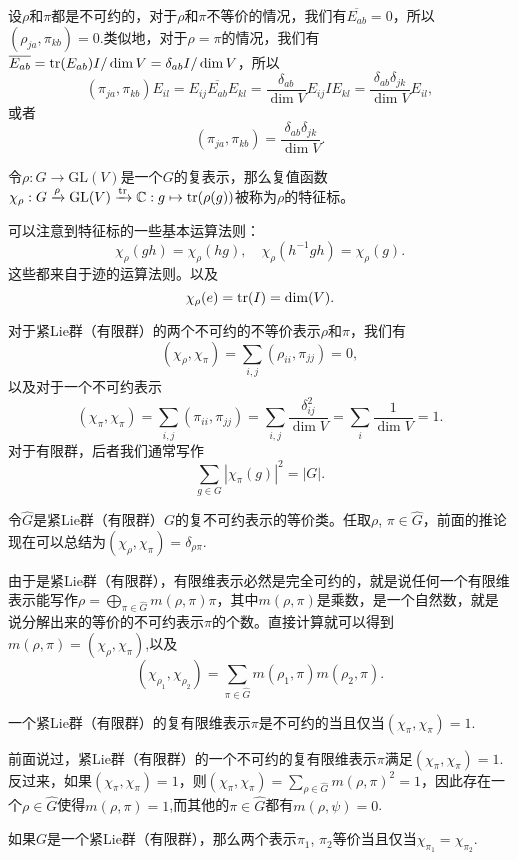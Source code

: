 \documentclass[11pt]{article}
\theoremstyle{definition}
\theoremstyle{plain}
\newcommand{\cc}{\mathbb{C}}
\begin{document}
\para 设$\rho$和$\pi$都是不可约的，对于$\rho$和$\pi$不等价的情况，我们有$\overline{E_{ab}}=0$，所以$\left(\rho_{ja},\pi_{kb}\right)=0$.类似地，对于$\rho=\pi$的情况，我们有$\overline{E_{ab}}=\operatorname{tr}(E_{ab})I/\dim V=\delta_{ab}I/\dim V$，所以
\[
	\left(\pi_{ja},\pi_{kb}\right)E_{il}=E_{ij}\overline{E_{ab}}E_{kl}=\frac{\delta_{ab}}{\dim V}E_{ij}IE_{kl}=\frac{\delta_{ab}\delta_{jk}}{\dim V}E_{il},
\]
或者
\[
	\left(\pi_{ja},\pi_{kb}\right)=\frac{\delta_{ab}\delta_{jk}}{\dim V}.
\]

\para 令$\rho:G\to \mathrm{GL}(V)$是一个$G$的复表示，那么复值函数$\chi_\rho:G\xrightarrow{\rho}\mathrm{GL}(V)\xrightarrow{\tr}\cc:g\mapsto \tr(\rho(g))$被称为$\rho$的特征标。

可以注意到特征标的一些基本运算法则：
\[
	\chi_\rho(gh)=\chi_\rho(hg),\quad \chi_\rho(h^{-1}gh)= \chi_\rho(g).
\]
这些都来自于迹的运算法则。以及
\[
	\chi_\rho(e)=\operatorname{tr}(I)=\dim(V).
\]

\para 对于紧Lie群（有限群）的两个不可约的不等价表示$\rho$和$\pi$，我们有
\[
(\chi_\rho, \chi_\pi)=\sum_{i,j}\left(\rho_{ii},\pi_{jj}\right)=0,
\]
以及对于一个不可约表示
\[
(\chi_\pi, \chi_\pi)=\sum_{i,j}(\pi_{ii},\pi_{jj})=\sum_{i,j}\frac{\delta_{ij}^2}{\dim V}=\sum_{i}\frac{1}{\dim V}=1.
\]
对于有限群，后者我们通常写作
\[
	\sum_{g\in G} |\chi_\pi(g)|^2=|G|.
\]

令$\hat{G}$是紧Lie群（有限群）$G$的复不可约表示的等价类。任取$\rho$, $\pi\in\hat{G}$，前面的推论现在可以总结为$(\chi_\rho,\chi_\pi)=\delta_{\rho\pi}$.

由于是紧Lie群（有限群），有限维表示必然是完全可约的，就是说任何一个有限维表示能写作$\rho=\bigoplus_{\pi\in\hat{G}}m(\rho,\pi)\pi$，其中$m(\rho,\pi)$是乘数，是一个自然数，就是说分解出来的等价的不可约表示$\pi$的个数。直接计算就可以得到$m(\rho,\pi)=(\chi_\rho,\chi_\pi)$,以及
\begin{equation}
	(\chi_{\rho_1},\chi_{\rho_2})=\sum_{\pi\in\hat{G}}m(\rho_1,\pi)m(\rho_2,\pi).
\end{equation}

{\pro 一个紧Lie群（有限群）的复有限维表示$\pi$是不可约的当且仅当$(\chi_{\pi},\chi_{\pi})=1$. \endpro}

\proof 前面说过，紧Lie群（有限群）的一个不可约的复有限维表示$\pi$满足$(\chi_\pi, \chi_\pi)=1$. 反过来，如果$(\chi_\pi, \chi_\pi)=1$，则$(\chi_{\pi},\chi_{\pi})=\sum_{\rho\in\hat{G}}m(\rho,\pi)^2=1$，因此存在一个$\rho\in\hat{G}$使得$m(\rho,\pi)=1$,而其他的$\pi\in\hat{G}$都有$m(\rho,\psi)=0$.\endproof

{\pro 如果$G$是一个紧Lie群（有限群），那么两个表示$\pi_1$, $\pi_2$等价当且仅当$\chi_{\pi_1}=\chi_{\pi_2}$.\endpro}
\end{document}
